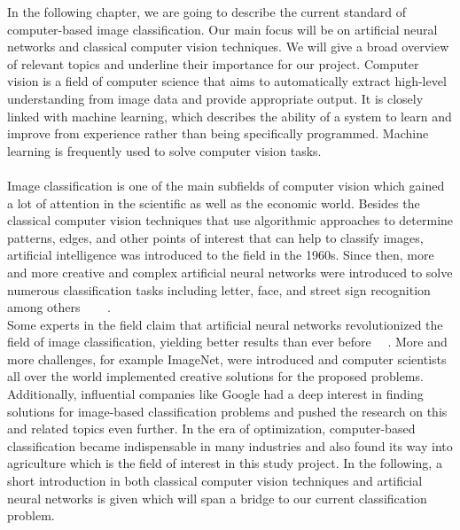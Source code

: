 In the following chapter, we are going to describe the current standard of computer-based image classification. Our main focus will be on artificial neural networks and classical computer vision techniques. We will give a broad overview of relevant topics and underline their importance for our project. Computer vision is a field of computer science that aims to automatically extract high-level understanding from image data and provide appropriate output. It is closely linked with machine learning, which describes the ability of a system to learn and improve from experience rather than being specifically programmed. Machine learning is frequently used to solve computer vision tasks. \\
\\
Image classification is one of the main subfields of computer vision which gained a lot of attention in the scientific as well as the economic world. Besides the classical computer vision techniques that use algorithmic approaches to determine patterns, edges, and other points of interest that can help to classify images, artificial intelligence was introduced to the field in the 1960s. Since then, more and more creative and complex artificial neural networks were introduced to solve numerous classification tasks including letter, face, and street sign recognition among others~\citep{mironczuk2018recent} ~\citep{balaban2015deep} ~\citep{stallkamp2011german}. \\
Some experts in the field claim that artificial neural networks revolutionized the field of image classification, yielding better results than ever before~\citep{he2016deep} ~\citep{krizhevsky2012imagenet}. More and more challenges, for example ImageNet, were introduced and computer scientists all over the world implemented creative solutions for the proposed problems. Additionally, influential companies like Google had a deep interest in finding solutions for image-based classification problems and pushed the research on this and related topics even further. In the era of optimization, computer-based classification became indispensable in many industries and also found its way into agriculture which is the field of interest in this study project.
In the following, a short introduction in both classical computer vision techniques and artificial neural networks is given which will span a bridge to our current classification problem. \\
\\

